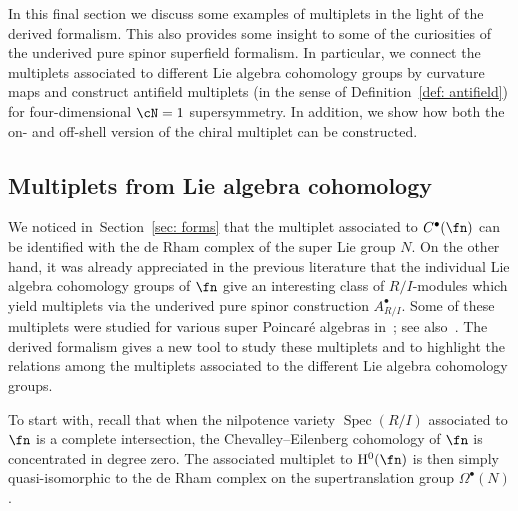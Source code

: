 \documentclass[10pt,a4paper]{amsart}
\numberwithin{equation}{section}
\DeclareMathOperator{\Spec}{Spec}
\begin{document}
In this final section we discuss some examples of multiplets in the light of the derived formalism. This also provides some insight to some of the curiosities of the underived pure spinor superfield formalism. In particular, we connect the multiplets associated to different Lie algebra cohomology groups by curvature maps and construct antifield multiplets (in the sense of Definition~\ref{def: antifield}) for four-dimensional $\cN=1$ supersymmetry. In addition, we show how both the on- and off-shell version of the chiral multiplet can be constructed.

\subsection{Multiplets from Lie algebra cohomology} \label{multiplet_from_cohomology_section}

We noticed in~Section~\ref{sec: forms} that the multiplet associated to $C^\bullet(\fn)$ can be identified with the de Rham complex of the super Lie group $N$. On the other hand, it was already appreciated in the previous literature that the individual Lie algebra cohomology groups of $\fn$ give an interesting class of $R/I$-modules which yield multiplets via the underived pure spinor construction $A^\bullet_{R/I}$. Some of these multiplets were studied for various super Poincar\'e algebras in~\cite[Section~6.3]{perspectives}; see also~\cite{MSX1}. The derived formalism gives a new tool to study these multiplets and to highlight the relations among the multiplets associated to the different Lie algebra cohomology groups.

To start with, recall that when the nilpotence variety $\Spec (R/I)$ associated to $\fn$ is a complete intersection, the Chevalley--Eilenberg cohomology of $\fn$ is concentrated in degree zero. The associated multiplet to $\mathrm H^0(\fn)$ is then simply quasi-isomorphic to the de Rham complex on the supertranslation group $\Omega^\bullet(N)$.
\end{document}
